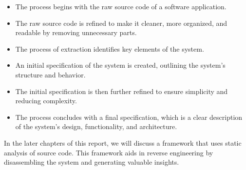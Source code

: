 \begin{itemize}
    \item The process begins with the raw source code of a software application.
    \item The raw source code is refined to make it cleaner, more organized, and readable by removing unnecessary parts.
    \item The process of extraction identifies key elements of the system.
    \item An initial specification of the system is created, outlining the system's structure and behavior.
    \item The initial specification is then further refined to ensure simplicity and reducing complexity.
    \item The process concludes with a final specification, which is a clear description of the system's design, functionality, and architecture.
\end{itemize}


In the later chapters of this report, we will discuss a framework that uses static analysis of source code. This framework aids in reverse engineering by disassembling the system and generating valuable insights.
